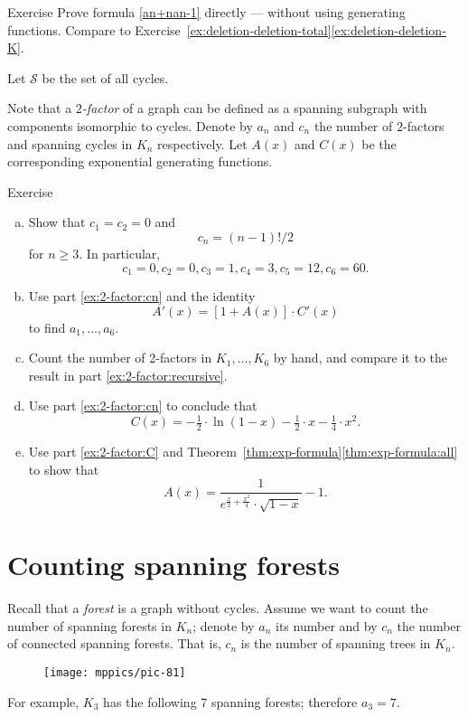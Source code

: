 \begin{thm}{Exercise}
Prove formula \ref{an+nan-1} directly --- without using generating functions.
Compare to Exercise~\ref{ex:deletion-deletion-total}\ref{ex:deletion-deletion-K}.
\end{thm}

Let $\mathcal{S}$ be the set of all cycles.

Note that a \emph{$2$-factor} of a graph can be defined as a spanning subgraph with components isomorphic to cycles.
Denote by $a_n$ and $c_n$ the number of $2$-factors and spanning cycles in $K_n$ respectively.
Let $A(x)$ and $C(x)$ be the corresponding exponential generating functions.

\begin{thm}{Exercise}
\begin{enumerate}[(a)]
\item\label{ex:2-factor:cn} Show that $c_1=c_2=0$ and 
\[c_n=(n-1)!/2\]
for $n\ge 3$.
In particular,
\[c_1=0, c_2=0, c_3=1, c_4=3, c_5=12, c_6=60.\]
\item\label{ex:2-factor:recursive} Use part \ref{ex:2-factor:cn} and the identity
\[A'(x)=[1+A(x)]\cdot C'(x)\]
to find $a_1,\dots, a_6$.
\item Count the number of 2-factors in $K_1,\dots,K_6$ by hand, and compare it to the result in part \ref{ex:2-factor:recursive}.
\item\label{ex:2-factor:C} Use part \ref{ex:2-factor:cn} to conclude that 
\[C(x)=-\tfrac12\cdot\ln(1-x)-\tfrac12\cdot x-\tfrac14\cdot x^2.\]
\item Use part \ref{ex:2-factor:C} and Theorem~\ref{thm:exp-formula}\ref{thm:exp-formula:all}
to show that
\[A(x)=\frac{1}{ e^{\frac x2+\frac{x^2}4}\cdot\sqrt{1-x}}-1.\]


\end{enumerate}

\end{thm}



\section*{Counting spanning forests}

Recall that a \emph{forest} is a graph without cycles.
Assume we want to count the number of spanning forests in $K_n$;
denote by $a_n$ its number and by $c_n$ the number of connected spanning forests. 
That is, $c_n$ is the number of spanning trees in $K_n$.
\begin{figure}[h!]%
\vskip-0mm
\centering
\texttt{[image: mppics/pic-81]}
\vskip-0mm
\end{figure}
For example, $K_3$ has the following 7 spanning forests; therefore $a_3=7$.

